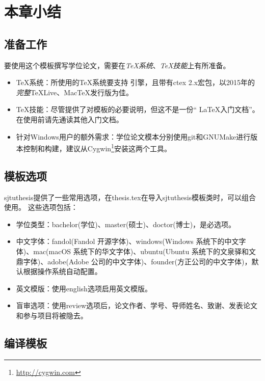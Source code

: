 \section{本章小结}

\subsection{准备工作}
\label{sec:requirements}

要使用这个模板撰写学位论文，需要在\emph{TeX系统}、\emph{TeX技能}上有所准备。

\begin{itemize}[noitemsep,topsep=0pt,parsep=0pt,partopsep=0pt]
	\item {\TeX}系统：所使用的{\TeX}系统要支持 \XeTeX 引擎，且带有ctex 2.x宏包，以2015年的\emph{完整}TeXLive、MacTeX发行版为佳。
	\item TeX技能：尽管提供了对模板的必要说明，但这不是一份“ \LaTeX 入门文档”。在使用前请先通读其他入门文档。
	\item 针对Windows用户的额外需求：学位论文模本分别使用git和GNUMake进行版本控制和构建，建议从Cygwin\footnote{\url{http://cygwin.com}}安装这两个工具。
\end{itemize}

\subsection{模板选项}
\label{sec:thesisoption}

sjtuthesis提供了一些常用选项，在thesis.tex在导入sjtuthesis模板类时，可以组合使用。
这些选项包括：

\begin{itemize}[noitemsep,topsep=0pt,parsep=0pt,partopsep=0pt]
	\item 学位类型：bachelor(学位)、master(硕士)、doctor(博士)，是必选项。
	\item 中文字体：fandol(Fandol 开源字体)、windows(Windows 系统下的中文字体)、mac(macOS 系统下的华文字体)、ubuntu(Ubuntu 系统下的文泉驿和文鼎字体)、adobe(Adobe 公司的中文字体)、founder(方正公司的中文字体)，默认根据操作系统自动配置。
	\item 英文模版：使用english选项启用英文模版。
	\item 盲审选项：使用review选项后，论文作者、学号、导师姓名、致谢、发表论文和参与项目将被隐去。
\end{itemize}

\subsection{编译模板}
\label{sec:process}

